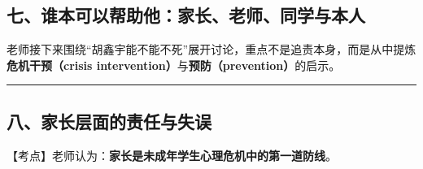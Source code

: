 \documentclass[
  chinese,
  9pt,
  a4paper,
]{ctexart}
\begin{document}
\subsection{七、谁本可以帮助他：家长、老师、同学与本人}\label{ux4e03ux8c01ux672cux53efux4ee5ux5e2eux52a9ux4ed6ux5bb6ux957fux8001ux5e08ux540cux5b66ux4e0eux672cux4eba}

老师接下来围绕``胡鑫宇能不能不死''展开讨论，重点不是追责本身，而是从中提炼\textbf{危机干预（crisis
intervention）}与\textbf{预防（prevention）}的启示。

\begin{center}\rule{0.5\linewidth}{0.5pt}\end{center}

\subsection{八、家长层面的责任与失误}\label{ux516bux5bb6ux957fux5c42ux9762ux7684ux8d23ux4efbux4e0eux5931ux8bef}

【考点】老师认为：\textbf{家长是未成年学生心理危机中的第一道防线}。
\end{document}
